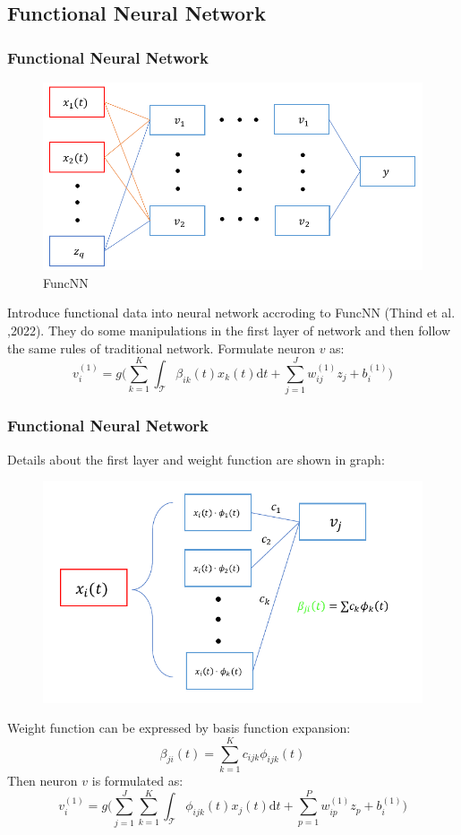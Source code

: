 \documentclass[
	9pt, %
]{beamer}
\begin{document}
\subsection{Functional Neural Network}
\begin{frame}
	\frametitle{Functional Neural Network}
	\begin{figure}
	\includegraphics[width=0.73\linewidth]{fnn4.pdf}
	\caption{FuncNN}
	\end{figure}
	Introduce functional data into neural network accroding to FuncNN (Thind et al. ,2022). They do some manipulations in the first layer of network and then follow the same rules of traditional network. Formulate neuron $v$ as:
	$$v_i^{(1)} = g\Big(\sum_{k=1}^K \int_\mathcal{T}\beta_{ik}(t)x_k(t)\mathrm{d}t + \sum_{j=1}^Jw_{ij}^{(1)}z_j + b_i^{(1)}\Big)$$
		
\end{frame}

\begin{frame}
	\frametitle{Functional Neural Network}
	Details about the first layer and weight function are shown in graph: 	
	\begin{figure}
	\includegraphics[width=0.5\linewidth]{fnn5.pdf}
	\end{figure}
	Weight function can be expressed by basis function expansion: 
	$$\beta_{ji}(t) = \sum_{k=1}^{K} c_{ijk}\phi_{ijk}(t)$$
	Then neuron $v$ is formulated as:
	\[v_i^{(1)} = g\Big(\sum_{j=1}^J \sum_{k=1}^{K}\int_\mathcal{T}\phi_{ijk}(t)x_j(t)\mathrm{d}t + \sum_{p=1}^Pw_{ip}^{(1)}z_p + b_i^{(1)}\Big)\]		
\end{frame}
\end{document}
